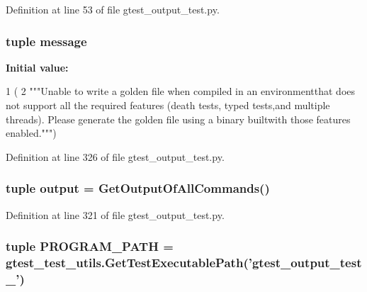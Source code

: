 \-Definition at line 53 of file gtest\-\_\-output\-\_\-test.\-py.

\hypertarget{namespacegtest__output__test_a536593b2a92b75b5c370d337feb4f615}{
\subsubsection[{message}]{\setlength{\rightskip}{0pt plus 5cm}tuple {\bf message}}}\label{d6/dc2/namespacegtest__output__test_a536593b2a92b75b5c370d337feb4f615}
{\bfseries \-Initial value\-:}
\begin{DoxyCode}
1 (
2           """Unable to write a golden file when compiled in an environmentthat
       does not support all the required features (death tests, typed tests,and
       multiple threads).  Please generate the golden file using a binary builtwith those
       features enabled.""")
\end{DoxyCode}


\-Definition at line 326 of file gtest\-\_\-output\-\_\-test.\-py.

\hypertarget{namespacegtest__output__test_acf316e258896197f4e917a6547e49532}{
\subsubsection[{output}]{\setlength{\rightskip}{0pt plus 5cm}tuple {\bf output} = {\bf \-Get\-Output\-Of\-All\-Commands}()}}\label{d6/dc2/namespacegtest__output__test_acf316e258896197f4e917a6547e49532}


\-Definition at line 321 of file gtest\-\_\-output\-\_\-test.\-py.

\hypertarget{namespacegtest__output__test_a3b816870dedd295e0dd9adf97b5f39b6}{
\subsubsection[{\-P\-R\-O\-G\-R\-A\-M\-\_\-\-P\-A\-T\-H}]{\setlength{\rightskip}{0pt plus 5cm}tuple {\bf \-P\-R\-O\-G\-R\-A\-M\-\_\-\-P\-A\-T\-H} = {\bf gtest\-\_\-test\-\_\-utils.\-Get\-Test\-Executable\-Path}('gtest\-\_\-output\-\_\-test\-\_\-')}}\label{d6/dc2/namespacegtest__output__test_a3b816870dedd295e0dd9adf97b5f39b6}


